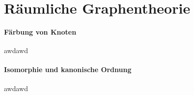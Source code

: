 \section{Räumliche Graphentheorie}
\label{raeumliche_graphentheorie}

\paragraph{Färbung von Knoten}
\label{faerbung_von_knoten}

awdawd

\paragraph{Isomorphie und kanonische Ordnung}
\label{isomorphie_und_kanonische_ordnung}

awdawd
